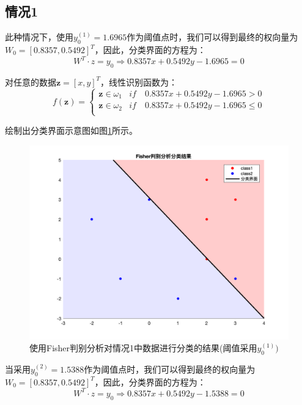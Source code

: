 \documentclass[cn]{elegantbook}
\begin{document}
\subsection{情况1}
此种情况下，使用$y_0^{(1)}=1.6965$作为阈值点时，我们可以得到最终的权向量为$W_0=[0.8357,0.5492]^T$，因此，分类界面的方程为：
\begin{equation}
W^T\cdot z=y_0\Rightarrow 0.8357x + 0.5492y - 1.6965=0
\end{equation}

对任意的数据$\mathbf{z}=[x,y]^T$，线性识别函数为：
\begin{equation}
f(\mathbf{z})=\left\{
\begin{array}{cc}
\mathbf{z}\in \omega_1 & if \quad 0.8357x + 0.5492y - 1.6965>0 \\
\mathbf{z}\in \omega_2 & if \quad 0.8357x + 0.5492y - 1.6965\le 0 \\
\end{array}
\right.
\end{equation}

绘制出分类界面示意图如图\ref{fig5}所示。


\begin{figure}[!h]
	\centering
	\includegraphics[width=\textwidth]{images/fisher1res1}
	\caption{\label{fig5}使用Fisher判别分析对情况1中数据进行分类的结果(阈值采用$y_0^{(1)})$}
\end{figure}

当采用$y_0^{(2)}=1.5388$作为阈值点时，我们可以得到最终的权向量为$W_0=[0.8357,0.5492]^T$，因此，分类界面的方程为：
\begin{equation}
W^T\cdot z=y_0\Rightarrow 0.8357x + 0.5492y - 1.5388=0
\end{equation}
\end{document}
